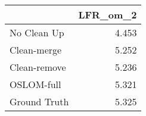 \begin{tabular}{lr}
\toprule
{} & LFR_om_2 \\
\midrule
No Clean Up  &    4.453 \\
Clean-merge  &    5.252 \\
Clean-remove &    5.236 \\
OSLOM-full   &    5.321 \\
Ground Truth &    5.325 \\
\bottomrule
\end{tabular}
